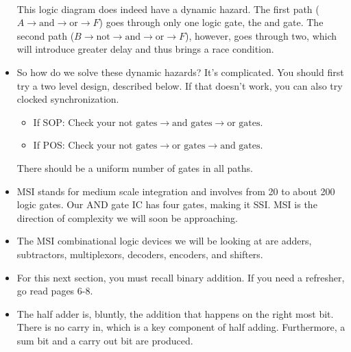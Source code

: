 \documentclass[10pt,a4paper]{article}
\begin{document}
\begin{itemize}
\\
This logic diagram does indeed have a dynamic hazard. The first path ($A\to\text{and}\to\text{or}\to F$) goes through only one logic gate, the and gate. The second path ($B\to\text{not}\to\text{and}\to\text{or}\to F$), however, goes through two, which will introduce greater delay and thus brings a race condition. 
\item So how do we solve these dynamic hazards? It's complicated. You should first try a two level design, described below. If that doesn't work, you can also try clocked synchronization.
\begin{itemize}
\item If SOP: Check your $\text{not gates}\to\text{and gates}\to\text{or gates}$.
\item If POS: Check your $\text{not gates}\to\text{or gates}\to\text{and gates}$.
\end{itemize}
There should be a uniform number of gates in all paths.
\item MSI stands for medium scale integration and involves from 20 to about 200 logic gates. Our AND gate IC has four gates, making it SSI. MSI is the direction of complexity we will soon be approaching.
\item The MSI combinational logic devices we will be looking at are adders, subtractors, multiplexors, decoders, encoders, and shifters. 
\item For this next section, you must recall binary addition. If you need a refresher, go read pages 6-8.
\item The half adder is, bluntly, the addition that happens on the right most bit. There is no carry in, which is a key component of half adding. Furthermore, a sum bit and a carry out bit are produced. 

\end{itemize}
\end{document}
